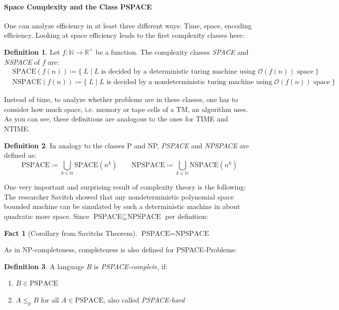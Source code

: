 \documentclass[10pt,fleqn]{article}
\theoremstyle{definition}
\newtheorem{definition}{Definition}
\newtheorem{fact}{Fact}
\theoremstyle{remark}
\newcommand{\spaceclass}{\text{SPACE}}
\newcommand{\nspaceclass}{\text{NSPACE}}
\newcommand{\pspaceclass}{\text{PSPACE}}
\newcommand{\npspaceclass}{\text{NPSPACE}}
\begin{document}
\paragraph*{Space Complexity and the Class PSPACE} One can analyze efficiency in at least three different ways: Time, space, encoding efficiency. Looking at space efficiency leads to the first complexity classes here:
\begin{definition} Let \(f\colon \mathbb{N} \rightarrow \mathbb{R}^+\) be a function. The complexity classes \emph{SPACE} and \emph{NSPACE} of \(f\) are:
\begin{align*}
    &\spaceclass(f(n)) \coloneqq \{ \; L \mid L \text{ is decided by a deterministic turing machine using } \mathcal{O}(f(n)) \text{ space} \; \}\\
    &\nspaceclass(f(n)) \coloneqq \{ \; L \mid L \text{ is decided by a nondeterministic turing machine using } \mathcal{O}(f(n)) \text{ space} \; \}
\end{align*}
\end{definition}
Instead of time, to analyze whether problems are in these classes, one has to consider how much space, i.e. memory or tape cells of a TM, an algorithm uses. As you can see, these definitions are analogous to the ones for TIME and NTIME.
\begin{definition} In analogy to the classes P and NP, \emph{PSPACE} and \emph{NPSPACE} are defined as:
    \[
        \pspaceclass \coloneqq \bigcup_{k \in \mathbb{N}} \spaceclass(n^k) \qquad
        \npspaceclass \coloneqq \bigcup_{k \in \mathbb{N}} \nspaceclass(n^k)
    \]
\end{definition}
One very important and surprising result of complexity theory is the following: The researcher Savitch showed that any nondeterministic polynomial space bounded machine can be simulated by such a deterministic machine in about quadratic more space. Since \(\pspaceclass \subseteq \npspaceclass\) per definition:
\begin{fact}[Corollary from Savitchs Theorem]
\(
    \pspaceclass = \npspaceclass
\)
\end{fact}
As in NP-completeness, completeness is also defined for PSPACE-Problems:
\begin{definition} A language \(B\) is \emph{PSPACE-complete}, if:
    \begin{enumerate}
        \item \(B \in \pspaceclass\)
        \item \(A \leq_p B\) for all \(A \in \pspaceclass\), also called \emph{PSPACE-hard}
    \end{enumerate}
\end{definition}
\end{document}

